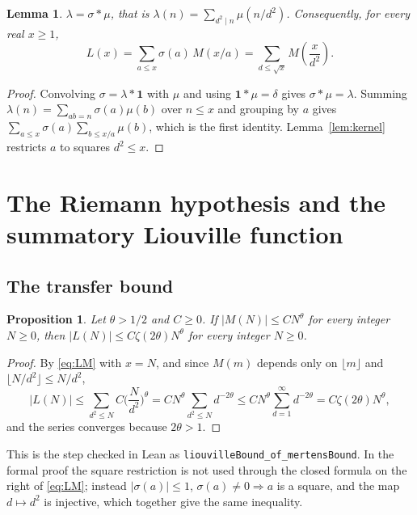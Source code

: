 \documentclass[11pt]{amsart}
\numberwithin{equation}{section}
\theoremstyle{plain}
\newtheorem{lem}[thm]{Lemma}
\newtheorem{prop}[thm]{Proposition}
\theoremstyle{definition}
\theoremstyle{remark}
\newcommand{\lean}[1]{\texttt{#1}}
\begin{document}
\begin{lem}\label{lem:conv}
$\lambda=\sigma*\mu$, that is $\lambda(n)=\sum_{d^2\mid n}\mu(n/d^2)$. Consequently, for every real $x\ge1$,
\begin{equation}\label{eq:LM}
L(x)=\sum_{a\le x}\sigma(a)\,M(x/a)=\sum_{d\le\sqrt x}M\!\left(\frac{x}{d^2}\right).
\end{equation}
\end{lem}

\begin{proof}
Convolving $\sigma=\lambda*\mathbf 1$ with $\mu$ and using $\mathbf 1*\mu=\delta$ gives $\sigma*\mu=\lambda$. Summing $\lambda(n)=\sum_{ab=n}\sigma(a)\mu(b)$ over $n\le x$ and grouping by $a$ gives $\sum_{a\le x}\sigma(a)\sum_{b\le x/a}\mu(b)$, which is the first identity. Lemma~\ref{lem:kernel} restricts $a$ to squares $d^2\le x$.
\end{proof}

\section{The Riemann hypothesis and the summatory Liouville function}\label{sec:rh}

\subsection{The transfer bound}

\begin{prop}\label{prop:transfer}
Let $\theta>1/2$ and $C\ge0$. If $|M(N)|\le CN^\theta$ for every integer $N\ge0$, then $|L(N)|\le C\zeta(2\theta)N^\theta$ for every integer $N\ge0$.
\end{prop}

\begin{proof}
By \eqref{eq:LM} with $x=N$, and since $M(m)$ depends only on $\lfloor m\rfloor$ and $\lfloor N/d^2\rfloor\le N/d^2$,
\[
|L(N)|\le\sum_{d^2\le N}C\Big(\frac{N}{d^2}\Big)^{\theta}=CN^\theta\sum_{d^2\le N}d^{-2\theta}\le CN^\theta\sum_{d=1}^\infty d^{-2\theta}=C\zeta(2\theta)N^\theta,
\]
and the series converges because $2\theta>1$.
\end{proof}

This is the step checked in Lean as \lean{liouvilleBound\_of\_mertensBound}. In the formal proof the square restriction is not used through the closed formula on the right of \eqref{eq:LM}; instead $|\sigma(a)|\le1$, $\sigma(a)\ne0\Rightarrow a$ is a square, and the map $d\mapsto d^2$ is injective, which together give the same inequality.
\end{document}
